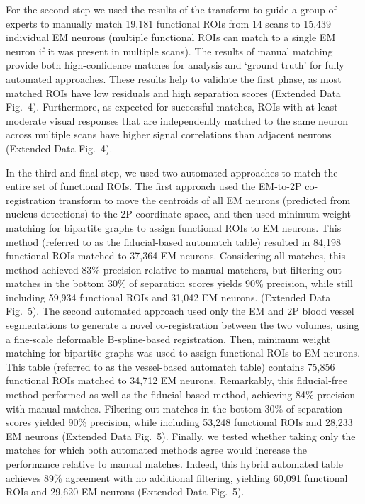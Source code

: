 \documentclass{article}
\begin{document}
For the second step we used the results of the transform to guide a group of experts to manually match 19,181 functional ROIs from 14 scans to 15,439 individual EM neurons (multiple functional ROIs can match to a single EM neuron if it was present in multiple scans). The results of manual matching provide both high-confidence matches for analysis and ‘ground truth’ for fully automated approaches. These results help to validate the first phase, as most matched ROIs have low residuals and high separation scores (Extended Data Fig.~4). Furthermore, as expected for successful matches, ROIs with at least moderate visual responses that are independently matched to the same neuron across multiple scans have higher signal correlations than adjacent neurons (Extended Data Fig.~4).

In the third and final step, we used two automated approaches to match the entire set of functional ROIs. The first approach used the EM-to-2P co-registration transform to move the centroids of all EM neurons (predicted from nucleus detections) to the 2P coordinate space, and then used minimum weight matching for bipartite graphs to assign functional ROIs to EM neurons. This method (referred to as the fiducial-based automatch table) resulted in 84,198 functional ROIs matched to 37,364 EM neurons. Considering all matches, this method achieved 83\% precision relative to manual matchers, but filtering out matches in the bottom 30\% of separation scores yields 90\% precision, while still including 59,934 functional ROIs and 31,042 EM neurons. (Extended Data Fig.~5). The second automated approach used only the EM and 2P blood vessel segmentations to generate a novel co-registration between the two volumes, using a fine-scale deformable B-spline-based registration. Then, minimum weight matching for bipartite graphs was used to assign functional ROIs to EM neurons. This table (referred to as the vessel-based automatch table) contains 75,856 functional ROIs matched to 34,712 EM neurons. Remarkably, this fiducial-free method performed as well as the fiducial-based method, achieving 84\% precision with manual matches. Filtering out matches in the bottom 30\% of separation scores yielded 90\% precision, while including 53,248 functional ROIs and 28,233 EM neurons (Extended Data Fig.~5). Finally, we tested whether taking only the matches for which both automated methods agree would increase the performance relative to manual matches. Indeed, this hybrid automated table achieves 89\% agreement with no additional filtering, yielding 60,091 functional ROIs and 29,620 EM neurons (Extended Data Fig.~5).
\end{document}
